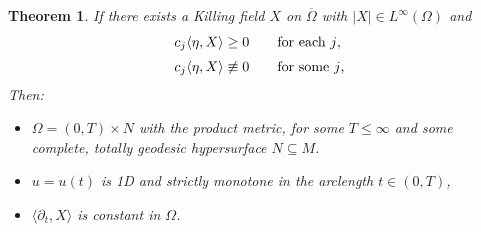 \documentclass[10 pt,a4paper]{article}
\newtheorem{theorem}[definition]{Theorem}
\theoremstyle{definition}
\begin{document}
\begin{theorem}
	If there exists a Killing field $X$ on $\overline\Omega$ with $|X| \in L^\infty(\Omega)$ and  
	\begin{equation}\label{condi_Hcj}
		\begin{array}{l}
			\displaystyle c_j \langle \eta, X \rangle \ge 0 \qquad \text{for each $j$,} \\[0.2cm]
			\displaystyle c_j \langle \eta, X \rangle \not \equiv 0 \qquad \text{for some $j$,}
		\end{array} 
	\end{equation}
	Then:
	\begin{itemize}
		\item[i)] $\Omega = (0,T) \times N$ with the product metric, for some $T \le \infty$ and some complete, totally geodesic hypersurface $N \subseteq M$. 
		\item[ii)] $u= u(t)$ is 1D and strictly monotone in the arclength $t \in (0,T)$, 
		\item[iii)] $\langle \partial_t, X \rangle$ is constant in $\Omega$.
	\end{itemize}
\end{theorem}

\end{document}
